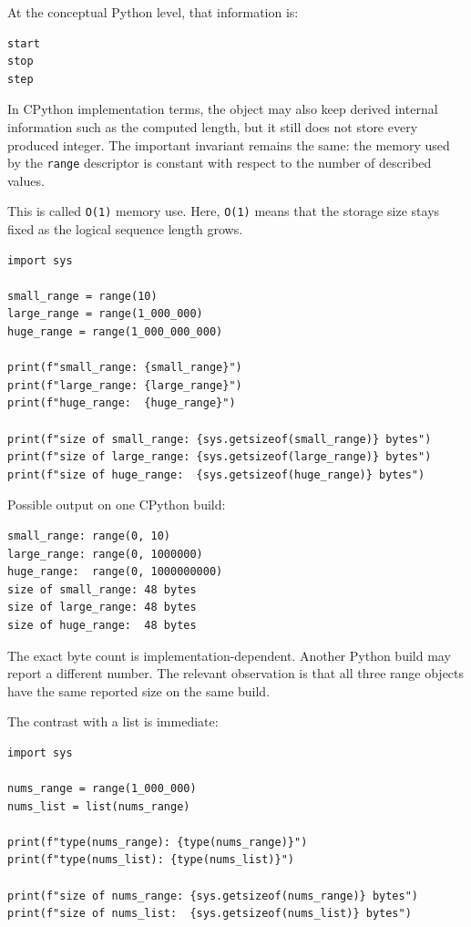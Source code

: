 At the conceptual Python level, that information is:

\begin{verbatim}
start
stop
step
\end{verbatim}

In CPython implementation terms, the object may also keep derived internal information such as the computed length, but it still does not store every produced integer. The important invariant remains the same: the memory used by the \texttt{range} descriptor is constant with respect to the number of described values.

This is called \texttt{O(1)} memory use. Here, \texttt{O(1)} means that the storage size stays fixed as the logical sequence length grows.

\begin{verbatim}
import sys

small_range = range(10)
large_range = range(1_000_000)
huge_range = range(1_000_000_000)

print(f"small_range: {small_range}")
print(f"large_range: {large_range}")
print(f"huge_range:  {huge_range}")

print(f"size of small_range: {sys.getsizeof(small_range)} bytes")
print(f"size of large_range: {sys.getsizeof(large_range)} bytes")
print(f"size of huge_range:  {sys.getsizeof(huge_range)} bytes")
\end{verbatim}

Possible output on one CPython build:

\begin{verbatim}
small_range: range(0, 10)
large_range: range(0, 1000000)
huge_range:  range(0, 1000000000)
size of small_range: 48 bytes
size of large_range: 48 bytes
size of huge_range:  48 bytes
\end{verbatim}

The exact byte count is implementation-dependent. Another Python build may report a different number. The relevant observation is that all three range objects have the same reported size on the same build.

The contrast with a list is immediate:

\begin{verbatim}
import sys

nums_range = range(1_000_000)
nums_list = list(nums_range)

print(f"type(nums_range): {type(nums_range)}")
print(f"type(nums_list): {type(nums_list)}")

print(f"size of nums_range: {sys.getsizeof(nums_range)} bytes")
print(f"size of nums_list:  {sys.getsizeof(nums_list)} bytes")
\end{verbatim}

